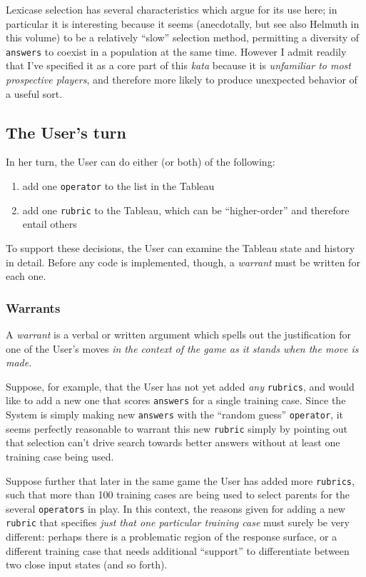 Lexicase selection has several characteristics which argue for its use here; in particular it is interesting because it seems (anecdotally, but see also Helmuth in this volume) to be a relatively ``slow'' selection method, permitting a diversity of {\tt answers} to coexist in a population at the same time. However I admit readily that I've specified it as a core part of this \emph{kata} because it is \emph{unfamiliar to most prospective players}, and therefore more likely to produce unexpected behavior of a useful sort.

\subsection{The User's turn}\hypertarget{the-users-turn}{}\label{the-users-turn}

In her turn, the User can do either (or both) of the following:

\begin{enumerate}
\item add one {\tt operator} to the list in the Tableau
\item add one {\tt rubric} to the Tableau, which can be ``higher-order'' and therefore entail others
\end{enumerate}

To support these decisions, the User can examine the Tableau state and history in detail. Before any code is implemented, though, a \emph{warrant} must be written for each one.

\subsubsection{Warrants}\hypertarget{warrants}{}\label{warrants}

A \emph{warrant} is a verbal or written argument which spells out the justification for one of the User's moves \emph{in the context of the game as it stands when the move is made}.

Suppose, for example, that the User has not yet added \emph{any} {\tt rubrics}, and would like to add a new one that scores {\tt answers} for a single training case. Since the System is simply making new {\tt answers} with the ``random guess'' {\tt operator}, it seems perfectly reasonable to warrant this new {\tt rubric} simply by pointing out that selection can't drive search towards better answers without at least one training case being used.

Suppose further that later in the same game the User has added more {\tt rubrics}, such that more than 100 training cases are being used to select parents for the several {\tt operators} in play. In this context, the reasons given for adding a new {\tt rubric} that specifies \emph{just that one particular training case} must surely be very different: perhaps there is a problematic region of the response surface, or a different training case that needs additional ``support'' to differentiate between two close input states (and so forth).

